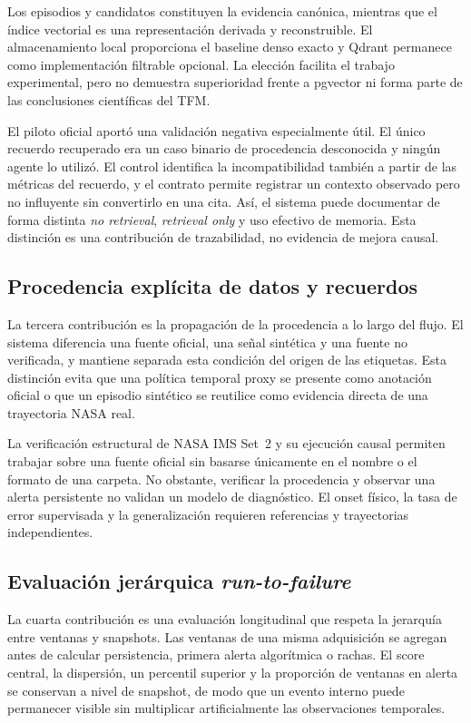 Los episodios y candidatos constituyen la evidencia canónica, mientras que el
índice vectorial es una representación derivada y reconstruible. El
almacenamiento local proporciona el baseline denso exacto y Qdrant permanece
como implementación filtrable opcional. La elección facilita el trabajo
experimental, pero no demuestra superioridad frente a pgvector ni forma parte
de las conclusiones científicas del TFM\@.

El piloto oficial aportó una validación negativa especialmente útil. El único
recuerdo recuperado era un caso binario de procedencia desconocida y ningún
agente lo utilizó. El control identifica la incompatibilidad también a partir
de las métricas del recuerdo, y el contrato permite registrar un contexto
observado pero no influyente sin
convertirlo en una cita. Así, el sistema puede documentar de forma distinta
\emph{no retrieval}, \emph{retrieval only} y uso efectivo de memoria. Esta
distinción es una contribución de trazabilidad, no evidencia de mejora causal.

\subsection{Procedencia explícita de datos y recuerdos}

La tercera contribución es la propagación de la procedencia a lo largo del
flujo. El sistema diferencia una fuente oficial, una señal sintética y una
fuente no verificada, y mantiene separada esta condición del origen de las
etiquetas. Esta distinción evita que una política temporal proxy se presente
como anotación oficial o que un episodio sintético se reutilice como evidencia
directa de una trayectoria NASA real.

La verificación estructural de NASA IMS Set~2 y su ejecución causal permiten
trabajar sobre una fuente oficial sin basarse únicamente en el nombre o el
formato de una carpeta. No obstante, verificar la procedencia y observar una
alerta persistente no validan un modelo de diagnóstico. El onset físico, la tasa
de error supervisada y la generalización requieren referencias y trayectorias
independientes.

\subsection{Evaluación jerárquica \textit{run-to-failure}}

La cuarta contribución es una evaluación longitudinal que respeta la jerarquía
entre ventanas y snapshots. Las ventanas de una misma adquisición se agregan
antes de calcular persistencia, primera alerta algorítmica o rachas. El score central, la
dispersión, un percentil superior y la proporción de ventanas en alerta se
conservan a nivel de snapshot, de modo que un evento interno puede permanecer
visible sin multiplicar artificialmente las observaciones temporales.

